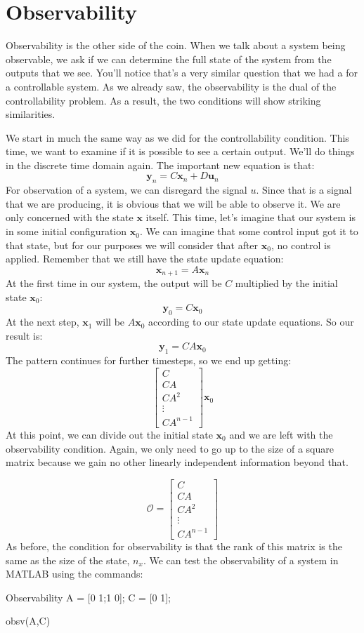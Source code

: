 \section{Observability}
Observability is the other side of the coin. When we talk about a system being observable, we ask if we can determine the full state of the system from the outputs that we see. You'll notice that's a very similar question that we had a for a controllable system. As we already saw, the observability is the dual of the controllability problem. As a result, the two conditions will show striking similarities.

We start in much the same way as we did for the controllability condition. This time, we want to examine if it is possible to see a certain output. We'll do things in the discrete time domain again. The important new equation is that:
$$\bm{y}_n=C\bm{x}_n+D\bm{u}_n$$
For observation of a system, we can disregard the signal $u$. Since that is a signal that we are producing, it is obvious that we will be able to observe it. We are only concerned with the state $\bm{x}$ itself. This time, let's imagine that our system is in some initial configuration $\bm{x}_0$. We can imagine that some control input got it to that state, but for our purposes we will consider that after $\bm{x}_0$, no control is applied. Remember that we still have the state update equation:
$$\bm{x}_{n+1}=A\bm{x}_n$$
At the first time in our system, the output will be $C$ multiplied by the initial state $\bm{x}_0$:
$$\bm{y}_0=C\bm{x}_0$$
At the next step, $\bm{x}_1$ will be $A\bm{x}_0$ according to our state update equations. So our result is:
$$\bm{y}_1=CA\bm{x}_0$$
The pattern continues for further timesteps, so we end up getting:
$$\begin{bmatrix}
    C\\CA\\CA^2\\\vdots \\CA^{n-1}
\end{bmatrix}\bm{x}_0$$
At this point, we can divide out the initial state $\bm{x}_0$ and we are left with the observability condition. Again, we only need to go up to the size of a square matrix because we gain no other linearly independent information beyond that.

$$\mathcal{O}=\begin{bmatrix}
    C\\CA\\CA^2\\\vdots \\CA^{n-1}
\end{bmatrix}$$
As before, the condition for observability is that the rank of this matrix is the same as the size of the state, $n_x$. We can test the observability of a system in MATLAB using the commands:
\begin{matlabscript}{Observability}
A = [0 1;1 0];
C = [0 1];

obsv(A,C)
\end{matlabscript}


